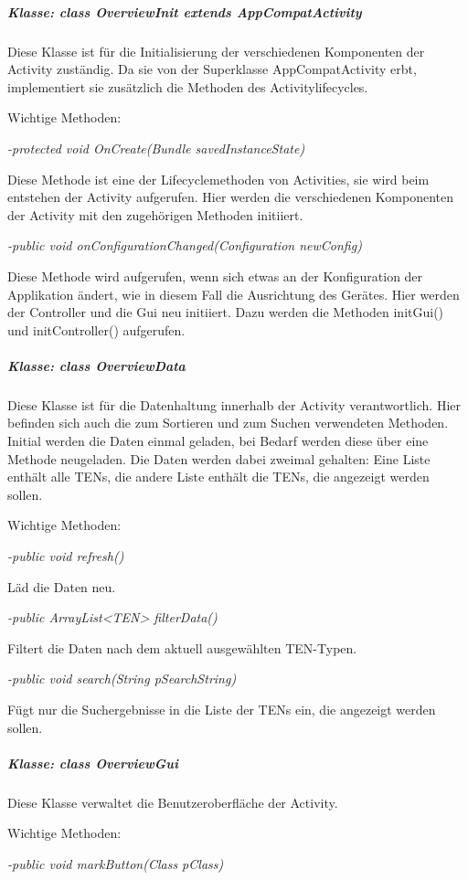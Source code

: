 \subparagraph*{Klasse: class OverviewInit extends AppCompatActivity}

Diese Klasse ist für die Initialisierung der verschiedenen Komponenten der Activity zuständig. Da sie von der Superklasse AppCompatActivity erbt, implementiert sie zusätzlich die Methoden des Activitylifecycles.

Wichtige Methoden:

\textit{-protected void OnCreate(Bundle savedInstanceState)}

Diese Methode ist eine der Lifecyclemethoden von Activities, sie wird beim entstehen der Activity aufgerufen. Hier werden die verschiedenen Komponenten der Activity mit den zugehörigen Methoden initiiert.

\textit{-public void onConfigurationChanged(Configuration newConfig)}

Diese Methode wird aufgerufen, wenn sich etwas an der Konfiguration der Applikation ändert, wie in diesem Fall die Ausrichtung des Gerätes. Hier werden der Controller und die Gui neu initiiert. Dazu werden die Methoden initGui() und initController() aufgerufen.

\subparagraph*{Klasse: class OverviewData}

Diese Klasse ist für die Datenhaltung innerhalb der Activity verantwortlich. Hier befinden sich auch die zum Sortieren und zum Suchen verwendeten Methoden. Initial werden die Daten einmal geladen, bei Bedarf werden diese über eine Methode neugeladen. Die Daten werden dabei zweimal gehalten: Eine Liste enthält alle TENs, die andere Liste enthält die TENs, die angezeigt werden sollen.

Wichtige Methoden:

\textit{-public void refresh()}

Läd die Daten neu.

\textit{-public ArrayList<TEN> filterData()}

Filtert die Daten nach dem aktuell ausgewählten TEN-Typen.

\textit{-public void search(String pSearchString)}

Fügt nur die Suchergebnisse in die Liste der TENs ein, die angezeigt werden sollen.

\subparagraph*{Klasse: class OverviewGui}

Diese Klasse verwaltet die Benutzeroberfläche der Activity.

Wichtige Methoden:

\textit{-public void markButton(Class pClass)}

